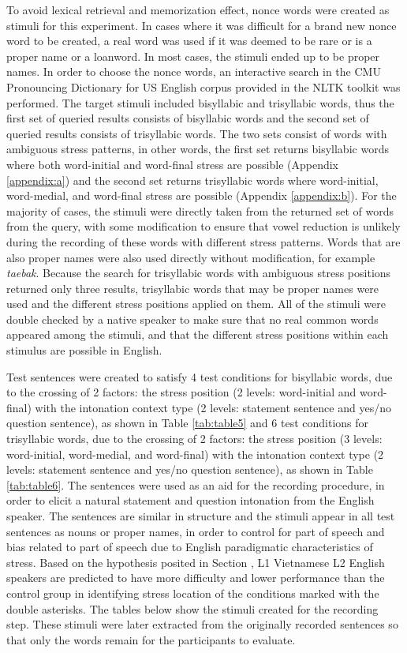 \documentclass[a4paper]{article}
\begin{document}
To avoid lexical retrieval and memorization effect, nonce words were created as stimuli for this experiment. In cases where it was difficult for a brand new nonce word to be created, a real word was used if it was deemed to be rare or is a proper name or a loanword. In most cases, the stimuli ended up to be proper names. In order to choose the nonce words, an interactive search in the CMU Pronouncing Dictionary for US English corpus provided in the NLTK toolkit was performed. The target stimuli included bisyllabic and trisyllabic words, thus the first set of queried results consists of bisyllabic words and the second set of queried results consists of trisyllabic words. The two sets consist of words with ambiguous stress patterns, in other words, the first set returns bisyllabic words where both word-initial and word-final stress are possible (Appendix \ref{appendix:a}) and the second set returns trisyllabic words where word-initial, word-medial, and word-final stress are possible (Appendix \ref{appendix:b}). For the majority of cases, the stimuli were directly taken from the returned set of words from the query, with some modification to ensure that vowel reduction is unlikely during the recording of these words with different stress patterns. Words that are also proper names were also used directly without modification, for example \textit{taebak}. Because the search for trisyllabic words with ambiguous stress positions returned only three results, trisyllabic words that may be proper names were used and the different stress positions applied on them. All of the stimuli were double checked by a native speaker to make sure that no real common words appeared among the stimuli, and that the different stress positions within each stimulus are possible in English.

Test sentences were created to satisfy 4 test conditions for bisyllabic words, due to the crossing of 2 factors: the stress position (2 levels: word-initial and word-final) with the intonation context type (2 levels: statement sentence and yes/no question sentence), as shown in Table \ref{tab:table5} and 6 test conditions for trisyllabic words, due to the crossing of 2 factors: the stress position (3 levels: word-initial, word-medial, and word-final) with the intonation context type (2 levels: statement sentence and yes/no question sentence), as shown in Table \ref{tab:table6}. The sentences were used as an aid for the recording procedure, in order to elicit a natural statement and question intonation from the English speaker. The sentences are similar in structure and the stimuli appear in all test sentences as nouns or proper names, in order to control for part of speech and bias related to part of speech due to English paradigmatic characteristics of stress. Based on the hypothesis posited in Section , L1 Vietnamese L2 English speakers are predicted to have more difficulty and lower performance than the control group in identifying stress location of the conditions marked with the double asterisks. The tables below show the stimuli created for the recording step. These stimuli were later extracted from the originally recorded sentences so that only the words remain for the participants to evaluate.
\end{document}
